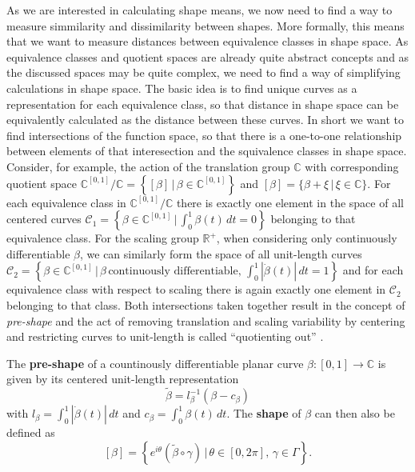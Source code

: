 \noindent As we are interested in calculating shape means, we now need to find a way to
measure simmilarity and dissimilarity between shapes.
More formally, this means that we want to measure distances between equivalence
classes in shape space.
As equivalence classes and quotient spaces are already quite abstract concepts
and as the discussed spaces may be quite complex, we need to find a way of
simplifying calculations in shape space.
The basic idea is to find unique curves as a representation for each equivalence
class, so that distance in shape space can be equivalently calculated as the
distance between these curves.
In short we want to find intersections of the function space, so that there is
a one-to-one relationship between elements of that interesection and the
squivalence classes in shape space.
Consider, for example, the action of the translation group $\mathbb{C}$
with corresponding quotient space $\mathbb{C}^{[0,1]} \big/ \mathbb{C} =
\left\{[\beta] \,|\, \beta \in \mathbb{C}^{[0,1]} \right\}$ and $[\beta] =
\{\beta + \xi\,|\, \xi \in \mathbb{C}\}$.
For each equivalence class in $\mathbb{C}^{[0,1]} \big/ \mathbb{C}$ there is
exactly one element in the space of all centered curves $\mathcal{C}_1 =
\left\{ \beta \in \mathbb{C}^{[0,1]}\,\big|\, \int_0^1 \beta(t) \, dt = 0
\right\}$ belonging to that equivalence class.
For the scaling group $\mathbb{R}^+$, when considering only continuously
differentiable $\beta$, we can similarly form the space of all unit-length
curves $\mathcal{C}_2 = \left\{\beta \in \mathbb{C}^{[0,1]}\,\big|\,
\beta\,\text{continuously differentiable},\, \int_0^1 |\dot{\beta}(t)| \, dt =
1 \right\}$ and for each equivalence class with respect to scaling there is
again exactly one element in $\mathcal{C}_2$ belonging to that class.
Both intersections taken together result in the concept of \textit{pre-shape}
and the act of removing translation and scaling variability by centering and
restricting curves to unit-length is called \enquote{quotienting out} \parencite[see][133\,f.]{SrivastavaKlassen2016}.
\begin{definition}
  The \textbf{pre-shape} of a countinously differentiable planar curve $\beta :
  [0,1] \rightarrow \mathbb{C}$ is given by its centered unit-length
  representation 
  $$\tilde\beta = l_\beta^{-1} \left(\beta - c_\beta\right)$$
  with $l_\beta = \int_0^1|\dot\beta(t)|\,dt$ and $c_\beta = \int_0^1
  \beta(t)\,dt$.
  The \textbf{shape} of $\beta$ can then also be defined as
  $$[\beta] = \left\{e^{i\theta}(\tilde\beta \circ \gamma) \,\big|\, \theta \in
  [0,2\pi],\, \gamma \in \Gamma\right\}.$$
\end{definition}
